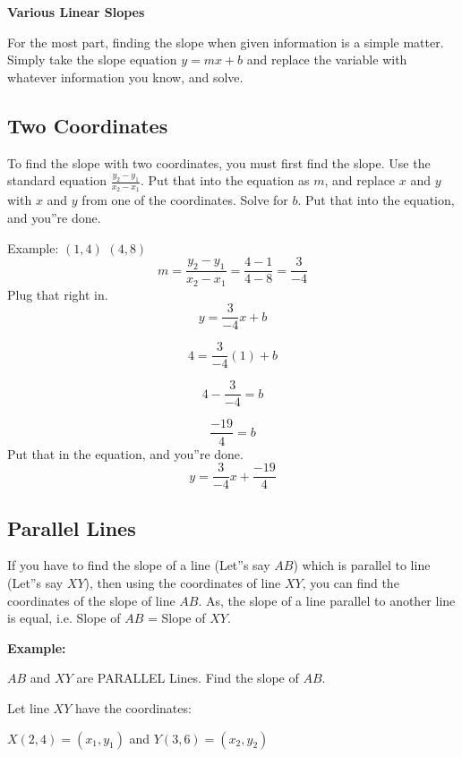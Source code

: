 \textbf{Various Linear Slopes}


For the most part, finding the slope when given information is a simple matter. Simply take the slope equation $y = mx + b$ and replace the variable with whatever information you know, and solve.

\subsection{Two Coordinates}
\label{sss:twoc-24d3}

To find the slope with two coordinates, you must first find the slope. Use the standard equation $\frac{y_2 - y_1}{x_2 - x_1}$. Put that into the equation as $m$, and replace $x$ and $y$ with $x$ and $y$ from one of the coordinates. Solve for $b$. Put that into the equation, and you''re done.

Example: $(1, 4)$ $(4, 8)$
\[
m = \frac{y_2 - y_1}{x_2 - x_1} = \frac{4 - 1}{4 - 8} = \frac{3}{-4}
\]
Plug that right in.
\[
y = \frac{3}{-4}x + b
\]

\[
4 = \frac{3}{-4}(1) + b
\]

\[
4 - \frac{3}{-4} = b
\]

\[
\frac{-19}{4} = b
\]
Put that in the equation, and you''re done.
\[
y = \frac{3}{-4}x + \frac{-19}{4}
\]

\subsection{Parallel Lines}
\label{sss:para-7283}

If you have to find the slope of a line (Let''s say $AB$) which is parallel to line (Let''s say $XY$), then using the coordinates of line $XY$, you can find the coordinates of the slope of line $AB$. As, the slope of a line parallel to another line is equal, i.e. Slope of $AB$ = Slope of $XY$.

\textbf{Example:}

$AB$ and $XY$ are PARALLEL Lines. Find the slope of $AB$.

Let line $XY$ have the coordinates:

$X(2, 4) = (x_1, y_1)$ and $Y(3, 6) = (x_2, y_2)$

